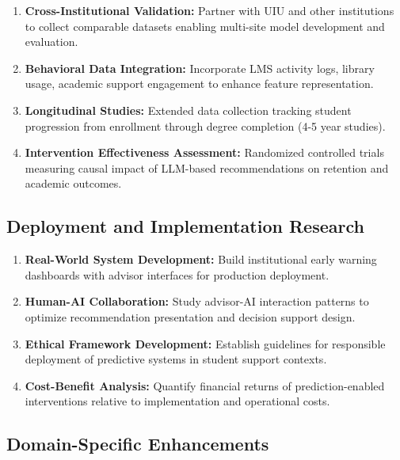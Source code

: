 \begin{enumerate}
\item \textbf{Cross-Institutional Validation:} Partner with UIU and other institutions to collect comparable datasets enabling multi-site model development and evaluation.

\item \textbf{Behavioral Data Integration:} Incorporate LMS activity logs, library usage, academic support engagement to enhance feature representation.

\item \textbf{Longitudinal Studies:} Extended data collection tracking student progression from enrollment through degree completion (4-5 year studies).

\item \textbf{Intervention Effectiveness Assessment:} Randomized controlled trials measuring causal impact of LLM-based recommendations on retention and academic outcomes.
\end{enumerate}

\subsection{Deployment and Implementation Research}

\begin{enumerate}
\item \textbf{Real-World System Development:} Build institutional early warning dashboards with advisor interfaces for production deployment.

\item \textbf{Human-AI Collaboration:} Study advisor-AI interaction patterns to optimize recommendation presentation and decision support design.

\item \textbf{Ethical Framework Development:} Establish guidelines for responsible deployment of predictive systems in student support contexts.

\item \textbf{Cost-Benefit Analysis:} Quantify financial returns of prediction-enabled interventions relative to implementation and operational costs.
\end{enumerate}

\subsection{Domain-Specific Enhancements}

